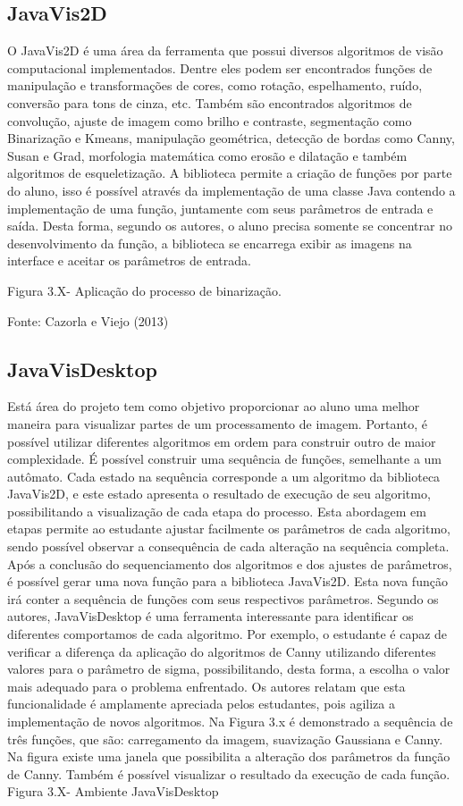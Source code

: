 \documentclass[
	12pt,				%
	oneside,			%
	a4paper,			%
	english,			%
	french,				%
	spanish,			%
	brazil,				%
	]{abntex2}
\begin{document}
\subsection{JavaVis2D}

	O JavaVis2D é uma área da ferramenta que possui diversos algoritmos de visão computacional implementados. Dentre eles podem ser encontrados funções de manipulação e transformações de cores, como rotação, espelhamento, ruído, conversão para tons de cinza, etc. Também são encontrados algoritmos de convolução, ajuste de imagem como brilho e contraste, segmentação como Binarização e Kmeans, manipulação geométrica, detecção de bordas como Canny, Susan e Grad, morfologia matemática como erosão e dilatação e também algoritmos de esqueletização. 
	A biblioteca permite a criação de funções por parte do aluno, isso é possível através da implementação de uma classe Java contendo a implementação de uma função, juntamente com seus parâmetros de entrada e saída. Desta forma, segundo os autores, o aluno precisa somente se concentrar no desenvolvimento da função, a biblioteca se encarrega exibir as imagens na interface e aceitar os parâmetros de entrada.

Figura 3.X- Aplicação do processo de binarização. 

Fonte: Cazorla e Viejo  (2013)

\subsection{JavaVisDesktop}

	Está área do projeto tem como objetivo proporcionar ao aluno uma melhor maneira para visualizar partes de um processamento de imagem. Portanto, é possível utilizar diferentes algoritmos em ordem para construir outro de maior complexidade. É possível construir uma sequência de funções, semelhante a um autômato. Cada estado na sequência corresponde a um algoritmo da biblioteca JavaVis2D, e este estado apresenta o resultado de execução de seu algoritmo, possibilitando a visualização de cada etapa do processo.
	Esta abordagem em etapas permite ao estudante ajustar facilmente os parâmetros de cada algoritmo, sendo possível observar a consequência de cada alteração na sequência completa. Após a conclusão do sequenciamento dos algoritmos e dos ajustes de parâmetros, é possível gerar uma nova função para a biblioteca JavaVis2D. Esta nova função irá conter a sequência de funções com seus respectivos parâmetros.
Segundo os autores, JavaVisDesktop é uma ferramenta interessante para identificar os diferentes comportamos de cada algoritmo. Por exemplo, o estudante é capaz de verificar a diferença da aplicação do algoritmos de Canny utilizando diferentes valores para o parâmetro de sigma, possibilitando, desta forma, a escolha o valor mais adequado para o problema enfrentado. Os autores relatam que esta funcionalidade é amplamente apreciada pelos estudantes, pois agiliza a implementação de novos algoritmos.
	Na Figura 3.x é demonstrado a sequência de três funções, que são: carregamento da imagem, suavização Gaussiana e Canny. Na figura existe uma janela que possibilita a alteração dos parâmetros da função de Canny. Também é possível visualizar o resultado da execução de cada função.
Figura 3.X- Ambiente JavaVisDesktop
\end{document}
